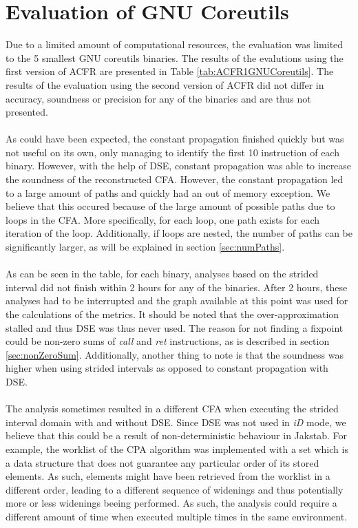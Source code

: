 \documentclass{kththesis}
\renewcommand{\it}[1]{\textit{#1}}
\begin{document}
\section{Evaluation of GNU Coreutils}\label{sec:evalGNU}
Due to a limited amount of computational resources, the evaluation was limited to the 5 smallest GNU coreutils binaries. The results of the evalutions using the first version of ACFR are presented in Table \ref{tab:ACFR1GNUCoreutils}. The results of the evaluation using the second version of ACFR did not differ in accuracy, soundness or precision for any of the binaries and are thus not presented.
\\ \\
As could have been expected, the constant propagation finished quickly but was not useful on its own, only managing to identify the first 10 instruction of each binary. However, with the help of DSE, constant propagation was able to increase the soundness of the reconstructed CFA. However, the constant propagation led to a large amount of paths and quickly had an out of memory exception. We believe that this occured because of the large amount of possible paths due to loops in the CFA. More specifically, for each loop, one path exists for each iteration of the loop. Additionally, if loops are nested, the number of paths can be significantly larger, as will be explained in section \ref{sec:numPaths}.
\\ \\
As can be seen in the table, for each binary, analyses based on the strided interval did not finish within 2 hours for any of the binaries. After 2 hours, these analyses had to be interrupted and the graph available at this point was used for the calculations of the metrics. It should be noted that the over-approximation stalled and thus DSE was thus never used. The reason for not finding a fixpoint could be non-zero sums of \it{call} and \it{ret} instructions, as is described in section \ref{sec:nonZeroSum}. Additionally, another thing to note is that the soundness was higher when using strided intervals as opposed to constant propagation with DSE. 
\\ \\
The analysis sometimes resulted in a different CFA when executing the strided interval domain with and without DSE. Since DSE was not used in \it{iD} mode, we believe that this could be a result of non-deterministic behaviour in Jakstab. For example, the worklist of the CPA algorithm was implemented with a set which is a data structure that does not guarantee any particular order of its stored elements. As such, elements might have been retrieved from the worklist in a different order, leading to a different sequence of widenings and thus potentially more or less widenings beeing performed. As such, the analysis could require a different amount of time when executed multiple times in the same environment. 
\end{document}
